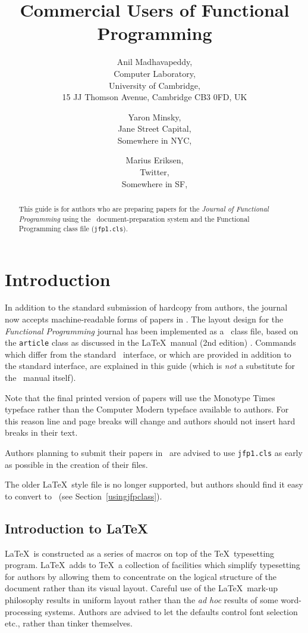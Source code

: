 \documentclass{jfp1}
\title[Commercial Users of Functional Programming 2011]{Commercial Users of Functional Programming}
\author[Anil Madhavapeddy]
       {Anil Madhavapeddy,\\
        Computer Laboratory,\\
        University of Cambridge,\\ 
        15 JJ Thomson Avenue, Cambridge CB3 0FD, UK\\
        \email{avsm2@cl.cam.ac.uk}}
\author[Yaron Minsky]
       {Yaron Minsky,\\
        Jane Street Capital,\\
        Somewhere in NYC,\\ 
        \email{yminsky@gmail.com}}
\author[Marius Eriksen]
       {Marius Eriksen,\\
        Twitter,\\
        Somewhere in SF,\\ 
        \email{marius@twitter.com}}
\begin{document}
\label{firstpage}

\maketitle

\begin{abstract}
This guide is for authors who are preparing papers for the \emph{Journal of
Functional Programming} using the \LaTeXe\ document-preparation system
and the Functional Programming class file (\texttt{jfp1.cls}).
\end{abstract}

\tableofcontents

\section{Introduction}

In addition to the standard submission of hardcopy from authors, the
journal now accepts machine-readable forms of papers
in \LaTeXe. The layout design for the \emph{Functional Programming} journal
has been implemented as a \LaTeXe\ class file, based on the \verb"article"
class as discussed in the \LaTeX\ manual (2nd edition) \cite{LaTeX}.
Commands which differ from the standard \LaTeXe\ interface, or which are
provided in addition to the standard interface, are explained in this
guide (which is \emph{not} a substitute for the \LaTeXe\ manual itself).

Note that the final printed version of papers will use the Monotype Times
typeface rather than the Computer Modern typeface available to authors. For
this reason line and page breaks will change and authors should not insert
hard breaks in their text.

Authors planning to submit their papers in \LaTeXe\ are advised to use
\verb"jfp1.cls" as early as possible in the creation of their files.

The older \LaTeX\ style file is no longer supported, but authors should
find it easy to convert to \LaTeXe\ (see Section~\ref{usingjfpclass}).

\subsection{Introduction to \LaTeX}

\LaTeX\ is constructed as a series of macros on top of the \TeX\ typesetting
program. \LaTeX\ adds to \TeX\ a collection of facilities which simplify
typesetting for authors by allowing them to concentrate on the logical
structure of the document rather than its visual layout. Careful use of the
\LaTeX\ mark-up philosophy results in uniform layout rather than the
\emph{ad hoc} results of some word-processing systems. Authors are advised to
let the defaults control font selection etc., rather than tinker themselves.
\end{document}
